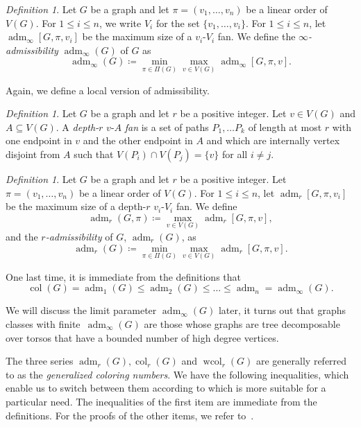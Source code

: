 \documentclass[1p,number,a4paper]{elsarticle}
\theoremstyle{remark}
\DeclareMathOperator{\col}{col}
\DeclareMathOperator{\wcol}{wcol}
\DeclareMathOperator{\adm}{adm}
\newtheorem{definition}[theorem]{Definition}
\begin{document}
\begin{definition}
Let $G$ be a graph and let $\pi=(v_1,\ldots, 
v_n)$ be a linear order of $V(G)$. For $1\leq i\leq n$, 
we write $V_i$ for the set $\{v_1,\ldots, v_i\}$. 
For $1\leq i\leq n$, let $\adm_\infty[G,\pi,v_i]$ be the maximum 
size of a $v_i$-$V_i$ fan. 
We define
the \emph{$\infty$-admissibility} $\adm_\infty(G)$ of $G$ as 
\[\adm_\infty(G)\coloneqq\min_{\pi\in \Pi(G)}\max_{v\in V(G)}\adm_\infty[G,\pi,v].\] 
\end{definition}

Again, we define a local version of admissibility. 

\begin{definition}\label{def:fan}
Let $G$ be a graph and let $r$ be a positive integer. Let $v\in V(G)$ and $A\subseteq V(G)$. 
A \emph{depth-$r$} $v$-$A$ \emph{fan} is a 
set of paths $P_1,\ldots P_k$ of length at most $r$ 
with one endpoint in $v$ and the
other endpoint in $A$ and which are internally 
vertex disjoint from $A$ 
such that $V(P_i)\cap V(P_j)=\{v\}$
for all $i\neq j$.
\end{definition}

\begin{definition}
Let $G$ be a graph and let $r$ be a positive integer. 
Let $\pi=(v_1,\ldots, 
v_n)$ be a linear order of $V(G)$. 
For $1\leq i\leq n$, let $\adm_r[G,\pi,v_i]$ be the maximum 
size of a depth-$r$ $v_i$-$V_i$ fan. 
We define 
\[\adm_r(G,\pi)\coloneqq \max_{v\in V(G)}\adm_r[G,\pi,v],\]
and the \emph{$r$-admissibility} of $G$, 
$\adm_r(G)$, as 
\[\adm_r(G)\coloneqq \min_{\pi\in \Pi(G)}\max_{v\in V(G)}\adm_r[G,\pi,v].\] 
\end{definition}


One last time, it is immediate from the definitions that 
\[\col(G)=\adm_1(G)\leq \adm_2(G)\leq \ldots \leq \adm_n=\adm_\infty(G).\] 

We will discuss the limit parameter $\adm_\infty(G)$ later, it turns
out that graphs classes with finite~$\adm_\infty(G)$ are 
those whose graphs 
are tree decomposable over torsos that have a bounded number 
of high degree vertices. 

\medskip
The three series $\adm_r(G), \col_r(G)$ and $\wcol_r(G)$ 
are generally referred to as the \emph{generalized coloring
numbers}. We have the following inequalities, which enable
us to switch between them according to 
which is more suitable for a particular need.
The inequalities of the first item are immediate from the definitions. For the
proofs of the other items, we refer to~\cite{siebertz2016nowhere}. 
\end{document}
